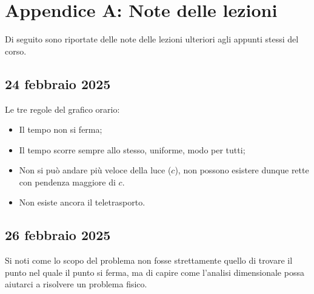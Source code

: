 \appendix 
\renewcommand{\thesection}{A.\arabic{section}}
\chapter{Appendice A: Note delle lezioni}
Di seguito sono riportate delle note delle lezioni ulteriori agli appunti stessi del corso.

\section{24 febbraio 2025}
\label{lez:24-02-2025}
Le tre regole del grafico orario:
\begin{itemize}
    \item Il tempo non si ferma;
    \item Il tempo scorre sempre allo stesso, uniforme, modo per tutti;
    \item Non si può andare più veloce della luce ($c$), non possono esistere dunque rette con pendenza maggiore di $c$.
    \item Non esiste ancora il teletrasporto.
\end{itemize}
\section{26 febbraio 2025}
\label{lez:26-02-2025}
Si noti come lo scopo del problema non fosse strettamente quello di trovare il punto nel quale il punto si ferma, ma di capire come l'analisi dimensionale possa aiutarci a risolvere un problema fisico.